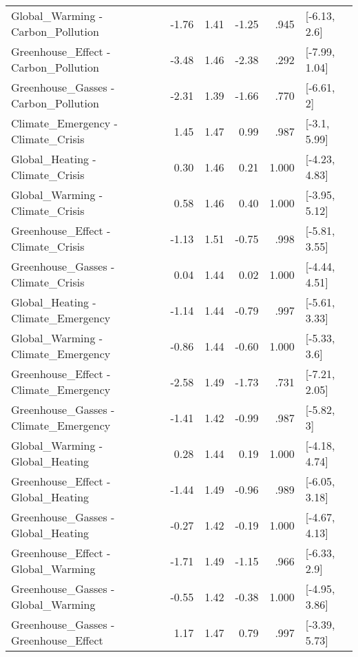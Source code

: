 \begin{table}[ht]
\begin{tabular}{lrrrrl}
  Global\_Warming - Carbon\_Pollution & -1.76 & 1.41 & -1.25 & .945 & [-6.13, 2.6] \\ 
  Greenhouse\_Effect - Carbon\_Pollution & -3.48 & 1.46 & -2.38 & .292 & [-7.99, 1.04] \\ 
  Greenhouse\_Gasses - Carbon\_Pollution & -2.31 & 1.39 & -1.66 & .770 & [-6.61, 2] \\ 
  Climate\_Emergency - Climate\_Crisis & 1.45 & 1.47 & 0.99 & .987 & [-3.1, 5.99] \\ 
  Global\_Heating - Climate\_Crisis & 0.30 & 1.46 & 0.21 & 1.000 & [-4.23, 4.83] \\ 
  Global\_Warming - Climate\_Crisis & 0.58 & 1.46 & 0.40 & 1.000 & [-3.95, 5.12] \\ 
  Greenhouse\_Effect - Climate\_Crisis & -1.13 & 1.51 & -0.75 & .998 & [-5.81, 3.55] \\ 
  Greenhouse\_Gasses - Climate\_Crisis & 0.04 & 1.44 & 0.02 & 1.000 & [-4.44, 4.51] \\ 
  Global\_Heating - Climate\_Emergency & -1.14 & 1.44 & -0.79 & .997 & [-5.61, 3.33] \\ 
  Global\_Warming - Climate\_Emergency & -0.86 & 1.44 & -0.60 & 1.000 & [-5.33, 3.6] \\ 
  Greenhouse\_Effect - Climate\_Emergency & -2.58 & 1.49 & -1.73 & .731 & [-7.21, 2.05] \\ 
  Greenhouse\_Gasses - Climate\_Emergency & -1.41 & 1.42 & -0.99 & .987 & [-5.82, 3] \\ 
  Global\_Warming - Global\_Heating & 0.28 & 1.44 & 0.19 & 1.000 & [-4.18, 4.74] \\ 
  Greenhouse\_Effect - Global\_Heating & -1.44 & 1.49 & -0.96 & .989 & [-6.05, 3.18] \\ 
  Greenhouse\_Gasses - Global\_Heating & -0.27 & 1.42 & -0.19 & 1.000 & [-4.67, 4.13] \\ 
  Greenhouse\_Effect - Global\_Warming & -1.71 & 1.49 & -1.15 & .966 & [-6.33, 2.9] \\ 
  Greenhouse\_Gasses - Global\_Warming & -0.55 & 1.42 & -0.38 & 1.000 & [-4.95, 3.86] \\ 
  Greenhouse\_Gasses - Greenhouse\_Effect & 1.17 & 1.47 & 0.79 & .997 & [-3.39, 5.73] \\ 
   \hline
\end{tabular}
\end{table}
